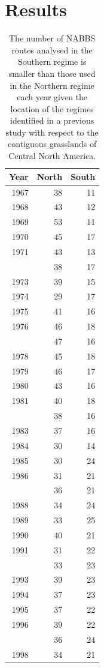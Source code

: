 \documentclass[print]{nuthesis}
\begin{document}
\hypertarget{results-3}{%
\section{Results}\label{results-3}}
\begin{longtable}{rrr}
\caption{\label{tab:nRtesPerRegimePerYearTab}The number of NABBS routes analysed in the Southern regime is smaller than those used in the Northern regime each year given the location of the regimes identified in a previous study with respect to the contiguous grasslands of Central North America.}\\
\toprule
Year & North & South\\
\midrule
1967 & 38 & 11\\
1968 & 43 & 12\\
1969 & 53 & 11\\
1970 & 45 & 17\\
1971 & 43 & 13\\
\addlinespace
1972 & 38 & 17\\
1973 & 39 & 15\\
1974 & 29 & 17\\
1975 & 41 & 16\\
1976 & 46 & 18\\
\addlinespace
1977 & 47 & 16\\
1978 & 45 & 18\\
1979 & 46 & 17\\
1980 & 43 & 16\\
1981 & 40 & 18\\
\addlinespace
1982 & 38 & 16\\
1983 & 37 & 16\\
1984 & 30 & 14\\
1985 & 30 & 24\\
1986 & 31 & 21\\
\addlinespace
1987 & 36 & 21\\
1988 & 34 & 24\\
1989 & 33 & 25\\
1990 & 40 & 21\\
1991 & 31 & 22\\
\addlinespace
1992 & 33 & 23\\
1993 & 39 & 23\\
1994 & 37 & 23\\
1995 & 37 & 22\\
1996 & 39 & 22\\
\addlinespace
1997 & 36 & 24\\
1998 & 34 & 21\\

\end{longtable}
\end{document}
